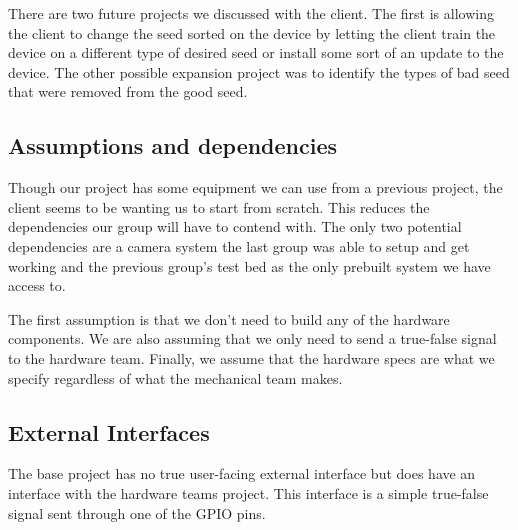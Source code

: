 \documentclass[onecolumn, draftclsnofoot,10pt, compsoc]{IEEEtran}
\begin{document}
	There are two future projects we discussed with the client.
	The first is allowing the client to change the seed sorted on the device by letting the client train the device on a different type of desired seed or install some sort of an update to the device.
	The other possible expansion project was to identify the types of bad seed that were removed from the good seed.
	
	\subsection{Assumptions and dependencies}
	Though our project has some equipment we can use from a previous project, the client seems to be wanting us to start from scratch.
	This reduces the dependencies our group will have to contend with.
	The only two potential dependencies are a camera system the last group was able to setup and get working and the previous group's test bed as the only prebuilt system we have access to.
	
	The first assumption is that we don’t need to build any of the hardware components.
	We are also assuming that we only need to send a true-false signal to the hardware team.
	Finally, we assume that the hardware specs are what we specify regardless of what the mechanical team makes.
	
	\subsection{External Interfaces}
	The base project has no true user-facing external interface but does have an interface with the hardware teams project.
	This interface is a simple true-false signal sent through one of the GPIO pins.
	
\end{document}
